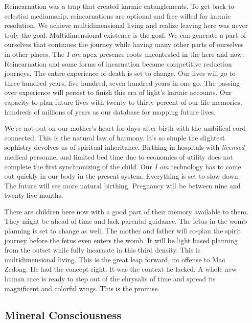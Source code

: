 Reincarnation was a trap that created karmic entanglements. To get back
to celestial mediumship, reincarnations are optional and free willed for
karmic resolution. We achieve multidimensional living and realize
leaving here was never truly the goal. Multidimensional existence is the
goal. We can generate a part of ourselves that continues the journey
while having many other parts of ourselves in other places. The \emph{I
am} apex presence roots uncontested in the here and now. Reincarnation
and some forms of incarnation became competitive reduction journeys. The
entire experience of death is set to change. Our lives will go to three
hundred years, five hundred, seven hundred years in one go. The passing
over experience will persist to finish this era of light's karmic
accounts. Our capacity to plan future lives with twenty to thirty
percent of our life memories, hundreds of millions of years as our
database for mapping future lives.

We're not put on our mother's heart for days after birth with the
umbilical cord connected. This is the natural law of harmony. It's so
simple the slightest sophistry devolves us of spiritual inheritance.
Birthing in hospitals with \emph{licensed} medical personnel and limited
bed time due to economies of utility does not complete the first
synchronizing of the child. Our \emph{I am} technology has to come out
quickly in our body in the present system. Everything is set to slow
down. The future will see more natural birthing. Pregnancy will be
between nine and twenty-five months.

There are children here now with a good part of their memory available
to them. They might be ahead of time and lack parental guidance. The
fetus in the womb planning is set to change as well. The mother and
father will co-plan the spirit journey before the fetus even enters the
womb. It will be light based planning from the outset while fully
incarnate in this third density. This is multidimensional living. This
is the great leap forward, no offense to Mao Zedong. He had the concept
right. It was the context he lacked. A whole new human race is ready to
step out of the chrysalis of time and spread its magnificent and
colorful wings. This is the promise.

\subsection{Mineral Consciousness}\label{mineral-consciousness}

